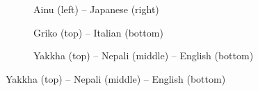 \begin{figure}[t]
\centering
    \begin{subfigure}[t]{\columnwidth}
    \centering
      \caption{Ainu (left) -- Japanese (right)}
      \vspace{-0.5em}
      \vspace{0.6em}
    \end{subfigure}
    \begin{subfigure}[t]{\columnwidth}
      \centering
      \caption{Griko (top) -- Italian (bottom)}
      \vspace{-0.5em}
      \vspace{0.7em}
    \end{subfigure}
    \begin{subfigure}[t]{\columnwidth}
      \centering
      \caption{Yakkha (top) -- Nepali (middle) -- English (bottom)}
      \vspace{-0.5em}

\end{subfigure}
\end{figure}
